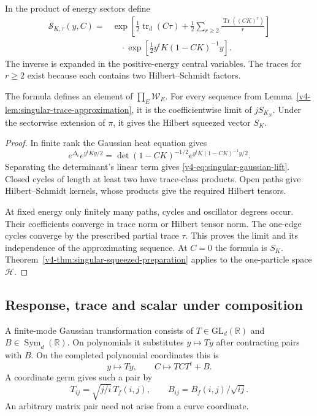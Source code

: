 In the product of energy sectors define
\begin{equation}\label{v4-eq:singular-gaussian-lift}
 \begin{aligned}
 \mathscr S_{K,\tau}(y,C)
  ={}&\exp\left[
       \frac12\operatorname{tr}_d(C\tau)
       +\frac12\sum_{r\geq2}\frac{\operatorname{Tr}((CK)^r)}r
             \right]\\
    &\quad\cdot
       \exp\left[\frac12y^tK(1-CK)^{-1}y\right].
 \end{aligned}
\end{equation}
The inverse is expanded in the
positive-energy central variables.
The traces for \(r\geq2\) exist
because each contains two Hilbert--Schmidt factors.

\begin{proposition}\label{v4-prop:singular-gaussian-lift}
The formula defines an element of
\(\prod_E\mathcal W_E\).
For every sequence from
Lemma~\ref{v4-lem:singular-trace-approximation},
it is the coefficientwise limit of \(jS_{K_N}\).
Under the sectorwise extension of \(\pi\),
it gives the Hilbert squeezed vector \(S_K\).
\end{proposition}

\begin{proof}
In finite rank the Gaussian heat equation gives
\[
 e^{\Delta_c}e^{y^tKy/2}
       =\det(1-CK)^{-1/2}
                     e^{y^tK(1-CK)^{-1}y/2}.
\]
Separating the determinant's linear term
gives \eqref{v4-eq:singular-gaussian-lift}.
Closed cycles of length at least two
have trace-class products.
Open paths give Hilbert--Schmidt kernels,
whose products give the required Hilbert tensors.

At fixed energy only finitely many paths,
cycles and oscillator degrees occur.
Their coefficients converge in trace norm
or Hilbert tensor norm.
The one-edge cycles converge by the
prescribed partial trace \(\tau\).
This proves the limit and its independence
of the approximating sequence.
At \(C=0\) the formula is \(S_K\).
Theorem~\ref{v4-thm:singular-squeezed-preparation}
applies to the one-particle space \(\mathcal H\).
\end{proof}

\subsection{Response, trace and scalar under composition}

A finite-mode Gaussian transformation consists
of \(T\in\mathrm{GL}_d(\mathbb R)\) and
\(B\in\operatorname{Sym}_d(\mathbb R)\).
On polynomials it substitutes \(y\mapsto Ty\)
after contracting pairs with \(B\).
On the completed polynomial coordinates
this is
\[
                   y\longmapsto Ty,\qquad
                   C\longmapsto TCT^t+B.
\]
A coordinate germ gives such a pair by
\[
 T_{ij}=\sqrt{j/i}\,T_f(i,j),\qquad
 B_{ij}=B_f(i,j)/\sqrt{ij}.
\]
An arbitrary matrix pair need not arise
from a curve coordinate.

